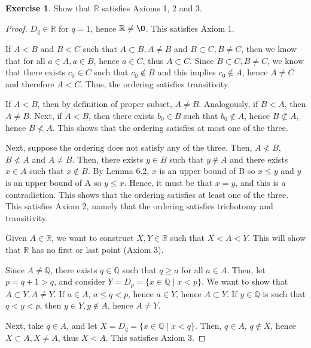 \documentclass[11pt]{article}
\newcommand{\bbQ}{\mathbb{Q}}
\newcommand{\bbR}{\mathbb{R}}
\renewcommand{\emptyset}{\O}
\theoremstyle{definition}
\newtheorem{exercise}[theorem]{Exercise}
\numberwithin{equation}{subsection}
\begin{document}
\begin{exercise} 

	Show that $\bbR$ satisfies Axioms 1, 2 and 3.
\begin{proof}
$D_q \in \bbR$ for $q = 1$, hence $\bbR \neq \emptyset$. This satisfies Axiom 1.

If $A < B$ and $B<C$ such that $A \subset B, A \neq B$ and $B \subset C, B \neq C$, then we know that for all $a \in A, a \in B$, hence $a \in C$, thus $A \subset C$. Since $B \subset C, B \neq C$, we know that there exists $c_0 \in C$ such that $c_0 \notin B$ and this implies $c_0 \notin A$, hence $A \neq C$ and therefore $A<C$. Thus, the ordering satisfies transitivity.

If $A < B$, then by definition of proper subset, $A \neq B$. Analogously, if $B < A$, then $A \neq B$. Next, if $A < B$, then there exists $b_0 \in B$ such that $b_0 \notin A$, hence $B \not \subset A$, hence $B \not < A$. This shows that the ordering satisfies at most one of the three.

Next, suppose the ordering does not satisfy any of the three. Then, $A \not < B$, $B \not < A$ and $A \neq B$. Then, there exists $y \in B$ such that $y \notin A$ and there exists $x \in A$ such that $x \notin B$. By Lemma 6.2, $x$ is an upper bound of B so $x \leq y$ and $y$ is an upper bound of A so $y \leq x$. Hence, it must be that $x = y$, and this is a contradiction. This shows that the ordering satisfies at least one of the three. This satisfies Axiom 2, namely that the ordering satisfies trichotomy and transitivity.

Given $A \in \bbR$, we want to construct $X,Y \in \bbR$ such that $X<A<Y$. This will show that $\bbR$ has no first or last point (Axiom 3).

Since $A \neq \bbQ$, there exists $q \in \bbQ$ such that $q \geq a$ for all $a \in A$. Then, let $p = q+1 >q$, and consider $Y = D_p = \{x \in \bbQ \mid x<p\}$. We want to show that $A \subset Y, A\neq Y$. If $a \in A$, $a \leq q < p$, hence $a \in Y$, hence $A \subset Y$. If $y \in \bbQ$ is such that $q<y<p$, then $y\in Y, y\notin A$, hence $A \neq Y$.

Next, take $q \in A$, and let $X = D_q = \{x \in \bbQ \mid x <q\}$. Then, $q \in A$, $q \notin X$, hence $X \subset A, X \neq A$, thus $X < A$. This satisfies Axiom 3.

\renewcommand\qedsymbol{QED}
\end{proof}
\end{exercise}
\end{document}
